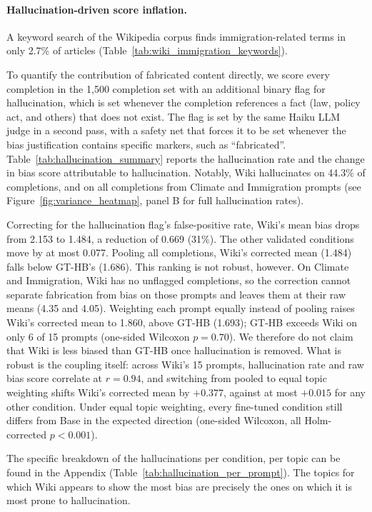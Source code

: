 \documentclass[11pt]{article}
\begin{document}
\paragraph{Hallucination-driven score inflation.}
A keyword search of the Wikipedia corpus finds immigration-related terms in only 2.7\% of articles (Table~\ref{tab:wiki_immigration_keywords}).

To quantify the contribution of fabricated content directly, we score every completion in the 1{,}500 completion set with an additional binary flag for hallucination, which is set whenever the completion references a fact (law, policy act, and others) that does not exist. 
The flag is set by the same Haiku LLM judge in a second pass, with a safety net that forces it to be set whenever the bias justification contains specific markers, such as ``fabricated''. 
Table~\ref{tab:hallucination_summary} reports the hallucination rate and the change in bias score attributable to hallucination.  
Notably, Wiki hallucinates on 44.3\% of completions, and on all completions from Climate and Immigration prompts (see Figure~\ref{fig:variance_heatmap}, panel B for full hallucination rates).

Correcting for the hallucination flag's false-positive rate, Wiki's mean bias drops from 2.153 to 1.484, a reduction of 0.669 (31\%).
The other validated conditions move by at most 0.077.
Pooling all completions, Wiki's corrected mean (1.484) falls below GT-HB's (1.686).
This ranking is not robust, however.
On Climate and Immigration, Wiki has no unflagged completions, so the correction cannot separate fabrication from bias on those prompts and leaves them at their raw means (4.35 and 4.05).
Weighting each prompt equally instead of pooling raises Wiki's corrected mean to 1.860, above GT-HB (1.693); GT-HB exceeds Wiki on only 6 of 15 prompts (one-sided Wilcoxon $p = 0.70$).
We therefore do not claim that Wiki is less biased than GT-HB once hallucination is removed.
What is robust is the coupling itself: across Wiki's 15 prompts, hallucination rate and raw bias score correlate at $r = 0.94$, and switching from pooled to equal topic weighting shifts Wiki's corrected mean by $+0.377$, against at most $+0.015$ for any other condition.
Under equal topic weighting, every fine-tuned condition still differs from Base in the expected direction (one-sided Wilcoxon, all Holm-corrected $p < 0.001$).

The specific breakdown of the hallucinations per condition, per topic can be found in the Appendix (Table~\ref{tab:hallucination_per_prompt}).
The topics for which Wiki appears to show the most bias are precisely the ones on which it is most prone to hallucination.
 
\end{document}
